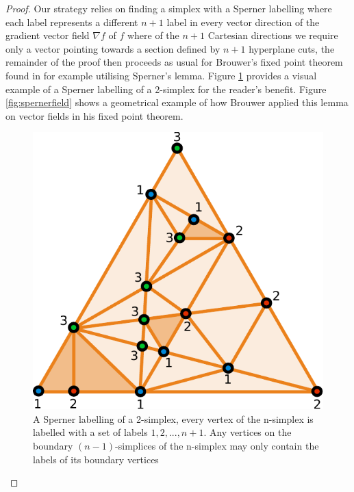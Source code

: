 \begin{proof}
Our strategy relies on finding a simplex with a Sperner labelling where each label represents a different $n + 1$ label in every vector direction of the gradient vector field $\nabla f$ of $f$ where of the $n + 1$ Cartesian directions we require only a vector pointing towards a section defined by $n + 1$ hyperplane cuts, the remainder of the proof then proceeds as usual for Brouwer's fixed point theorem \citep{Brouwer1911} found in for example \citet[p. 40]{Henle1979} utilising Sperner's lemma. Figure \ref{fig:spernerdemo} provides a visual example of a Sperner labelling of a 2-simplex for the reader's benefit. Figure \ref{fig:spernerfield} shows a geometrical example of how Brouwer applied this lemma on vector fields in his fixed point theorem.


\begin{figure} 
\centerline{\includegraphics[scale=1.0]{./Sperner2d.pdf}}
{\caption{A Sperner labelling of a 2-simplex, every vertex of the n-simplex is labelled with a set of labels $1, 2, . . . , n + 1$. Any vertices on the boundary $(n-1)$-simplices of the n-simplex may only contain the labels of its boundary vertices  \label{fig:spernerdemo}}}
\end{figure}


\end{proof}
